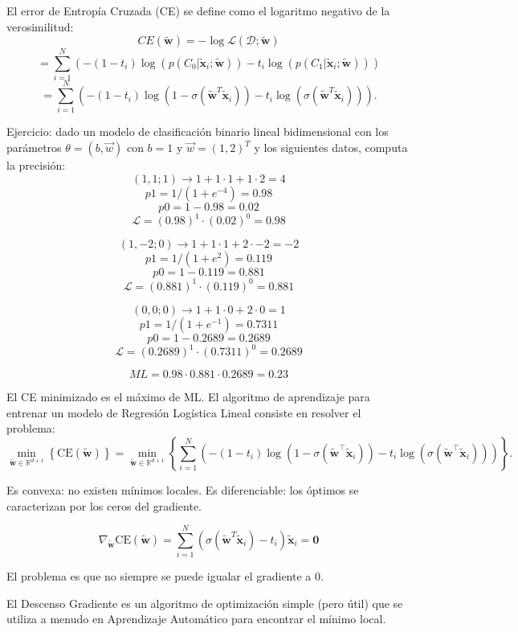 El error de Entropía Cruzada (CE) se define como el logaritmo negativo de la verosimilitud:
$$
CE(\tilde{\mathbf{w}}) = -\log\mathcal{L}(\mathcal{D};\tilde{\mathbf{w}})
$$
$$
= \sum_{i=1}^{N} \left( -(1 - t_i) \log(p(C_0|\tilde{\mathbf{x}}_i; \tilde{\mathbf{w}})) - t_i \log(p(C_1|\tilde{\mathbf{x}}_i; \tilde{\mathbf{w}})) \right)
$$
$$
= \sum_{i=1}^{N} \left( -(1 - t_i) \log(1 - \sigma(\tilde{\mathbf{w}}^{T}\tilde{\mathbf{x}}_i)) - t_i \log(\sigma(\tilde{\mathbf{w}}^{T}\tilde{\mathbf{x}}_i)) \right).
$$

Ejercicio: dado un modelo de clasificación binario lineal bidimensional con los parámetros $\theta = (b, \vec{w})$ con $b=1$ y $\vec{w} = (1,2)^T$ y los siguientes datos, computa la precisión:
$$(1,1; 1) \rightarrow 1 + 1 \cdot 1 + 1 \cdot 2 = 4 $$
$$p1 = 1 / (1 + e^{-4}) = 0.98$$
$$p0 = 1 - 0.98 = 0.02$$
$$\mathcal{L} = (0.98)^1 \cdot (0.02)^0 = 0.98$$

$$(1,-2; 0) \rightarrow 1 + 1 \cdot 1 + 2 \cdot -2 = -2 $$
$$p1 = 1 / (1 + e^{2}) = 0.119$$
$$p0 = 1 - 0.119 = 0.881$$
$$\mathcal{L} = (0.881)^1 \cdot (0.119)^0 = 0.881$$

$$(0,0; 0) \rightarrow 1 + 1 \cdot 0 + 2 \cdot 0 = 1 $$
$$p1 = 1 / (1 + e^{-1}) = 0.7311$$
$$p0 = 1 - 0.2689 = 0.2689$$
$$\mathcal{L} = (0.2689)^1 \cdot (0.7311)^0 = 0.2689$$

$$ML = 0.98 \cdot 0.881 \cdot 0.2689 = 0.23$$

El CE minimizado es el máximo de ML. El algoritmo de aprendizaje para entrenar un modelo de Regresión Logística Lineal consiste en resolver el problema:
$$\min_{\tilde{\mathbf{w}} \in \mathbb{R}^{d+1}} \left\{ \mathrm{CE}(\tilde{\mathbf{w}}) \right\} = \min_{\tilde{\mathbf{w}} \in \mathbb{R}^{d+1}} \left\{ \sum_{i=1}^N \left( -(1-t_i) \log (1-\sigma(\tilde{\mathbf{w}}^{\intercal} \tilde{\mathbf{x}}_i)) - t_i \log (\sigma(\tilde{\mathbf{w}}^{\intercal} \tilde{\mathbf{x}}_i)) \right) \right\}.$$

Es convexa: no existen mínimos locales. Es diferenciable: los óptimos se caracterizan por los ceros del gradiente.

$$\nabla_{\tilde{\mathbf{w}}} \text{CE}(\tilde{\mathbf{w}})=\sum^N_{i=1} (\sigma (\tilde{\mathbf{w}}^T \tilde{\mathbf{x}}_i) - t_i) \tilde{\mathbf{x}}_i = \mathbf{0}
$$

El problema es que no siempre se puede igualar el gradiente a 0.

El Descenso Gradiente es un algoritmo de optimización simple (pero útil) que se utiliza a menudo en Aprendizaje Automático para encontrar el mínimo local.


